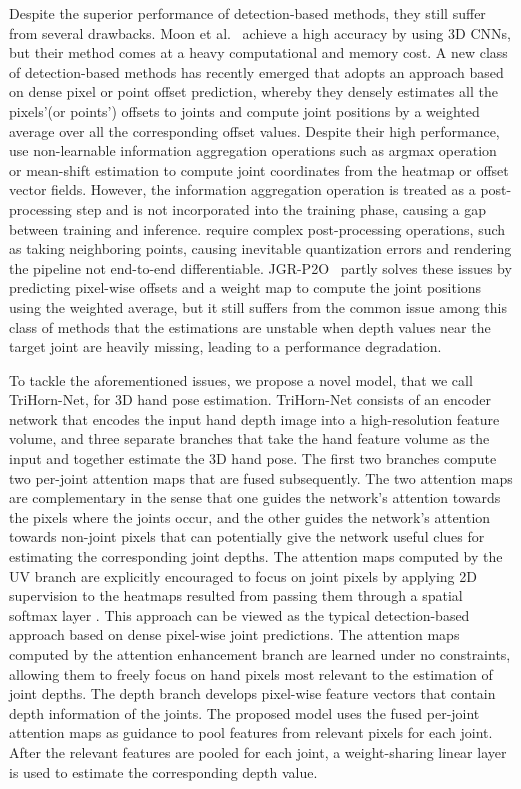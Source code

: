 \documentclass{article}
\begin{document}
Despite the superior performance of detection-based methods, they still suffer from several drawbacks. Moon et al.~\cite{moon2018v2v} achieve a high accuracy by using 3D CNNs, but their method comes at a heavy computational and memory cost. A new class of detection-based methods has recently emerged that adopts an approach based on dense pixel or point offset prediction, whereby they densely estimates all the pixels’(or points') offsets to joints and compute joint positions by a weighted average over all the corresponding offset values. Despite their high performance, \cite{li2019point,ren2019srn} use non-learnable information aggregation operations such as argmax operation or mean-shift estimation to compute joint coordinates from the heatmap or offset vector fields. However, the information  aggregation operation is treated as a post-processing step and is not incorporated into the training phase, causing a gap between training and inference. \cite{wan2018dense,ge2018hand} require complex post-processing operations, such as taking neighboring points, causing inevitable quantization errors and rendering the pipeline not end-to-end differentiable. JGR-P2O~\cite{fang2020jgr} partly solves these issues by predicting pixel-wise offsets and a weight map to compute the joint positions using the weighted average, but it still suffers from the common issue among this class of methods that the estimations are unstable when depth values near the target joint are heavily missing, leading to a performance degradation.
\par
To tackle the aforementioned issues, we propose a novel model, that we call TriHorn-Net, for 3D hand pose estimation. TriHorn-Net consists of an encoder network that encodes the input hand depth image into a high-resolution feature volume, and three separate branches that take the hand feature volume as the input and together estimate the 3D hand pose. The first two branches compute two per-joint attention maps that are fused subsequently. The two attention maps are complementary in the sense that one guides the network's attention towards the pixels where the joints occur, and the other guides the network's attention towards non-joint pixels that can potentially give the network useful clues for estimating the corresponding joint depths. The attention maps computed by the UV branch are explicitly encouraged to focus on joint pixels by applying 2D supervision to the heatmaps resulted from passing them through a spatial softmax layer \cite{iqbal2018hand}. This approach can be viewed as the typical detection-based approach based on dense pixel-wise joint predictions. The attention maps computed by the attention enhancement branch are learned under no constraints, allowing them to freely focus on hand pixels most relevant to the estimation of joint depths. The depth branch develops pixel-wise feature vectors that contain depth information of the joints. The proposed model uses the fused per-joint attention maps as guidance to pool features from relevant pixels for each joint. After the relevant features are pooled for each joint, a weight-sharing linear layer is used to estimate the corresponding depth value.
\end{document}

